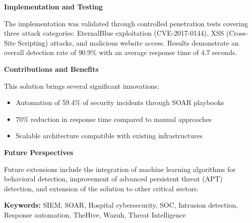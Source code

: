 \textbf{Implementation and Testing}

The implementation was validated through controlled penetration tests covering three attack categories: EternalBlue exploitation (CVE-2017-0144), XSS (Cross-Site Scripting) attacks, and malicious website access. Results demonstrate an overall detection rate of 90.9\% with an average response time of 4.7 seconds.

\vspace{0.5cm}
\clearpage

\textbf{Contributions and Benefits}

This solution brings several significant innovations:
\begin{itemize}
    \item Automation of 59.4\% of security incidents through SOAR playbooks
    \item 70\% reduction in response time compared to manual approaches
    \item Scalable architecture compatible with existing infrastructures
\end{itemize}

\vspace{0.5cm}

\textbf{Future Perspectives}

Future extensions include the integration of machine learning algorithms for behavioral detection, improvement of advanced persistent threat (APT) detection, and extension of the solution to other critical sectors.

\vspace{1cm}

\textbf{Keywords:} SIEM, SOAR, Hospital cybersecurity, SOC, Intrusion detection, Response automation, TheHive, Wazuh, Threat Intelligence

\newpage
